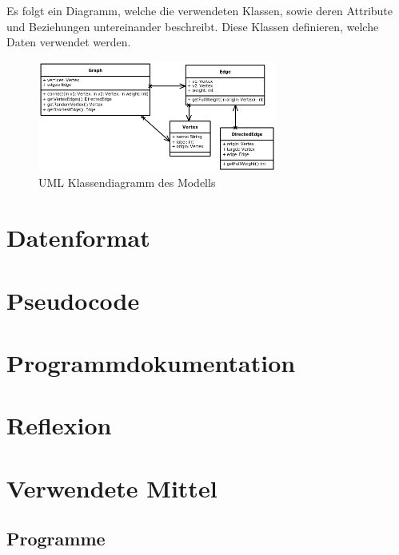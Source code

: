 \documentclass[a4paper,titlepage]{article}
\begin{document}
Es folgt ein Diagramm, welche die verwendeten Klassen, sowie deren Attribute und Beziehungen untereinander beschreibt. Diese Klassen definieren, welche Daten verwendet werden.

\begin{figure}[h]
\begin{center}
	\includegraphics[width=0.7\textwidth]{model_diagram2.png}
\end{center}
\caption{UML Klassendiagramm des Modells}
\end{figure}

\newpage

\section{Datenformat}


\newpage

\section{Pseudocode}

\newpage

\section{Programmdokumentation}

\newpage

\section{Reflexion}

\newpage

\section{Verwendete Mittel}

\subsection{Programme}
\end{document}

